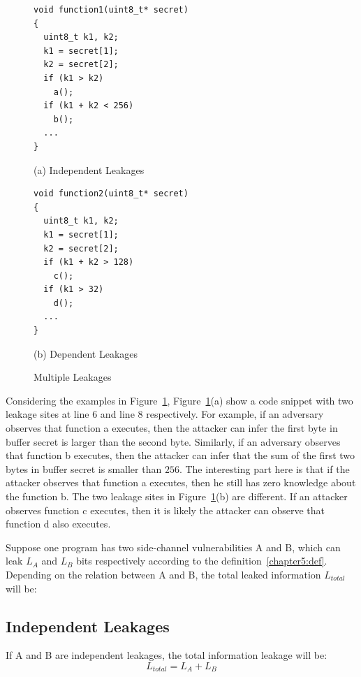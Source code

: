 \begin{figure}[h]
\begin{minipage}{0.4\linewidth}
\begin{lstlisting}
void function1(uint8_t* secret)
{
  uint8_t k1, k2;
  k1 = secret[1];
  k2 = secret[2];
  if (k1 > k2)
    a();
  if (k1 + k2 < 256)
    b();
  ...
}
\end{lstlisting}\caption*{(a) Independent Leakages}
\end{minipage}
\hfill
\begin{minipage}{0.4\linewidth}
\begin{lstlisting}
void function2(uint8_t* secret)
{
  uint8_t k1, k2;
  k1 = secret[1];
  k2 = secret[2];
  if (k1 + k2 > 128)
    c();
  if (k1 > 32)
    d();
  ...
}
\end{lstlisting} \caption*{(b) Dependent Leakages}
\end{minipage}
\caption{Multiple Leakages}\label{chapter5:fig:multiple}
\end{figure}

Considering the examples in Figure~\ref{chapter5:fig:multiple}, Figure~\ref{chapter5:fig:multiple}(a) show a code snippet with two leakage sites at line 6 and line 8 respectively. For example, if an adversary observes that function \textsf{a} executes, then the attacker can infer the first byte in buffer \textsf{secret} is larger than the second byte.  Similarly, if an adversary observes that function \textsf{b} executes, then the attacker can infer that the sum of the first two bytes in buffer \textsf{secret} is smaller than $256$. The interesting part here is that if the attacker observes that function \textsf{a} executes, then he still has zero knowledge about the function \textsf{b}. The two leakage sites in Figure~\ref{chapter5:fig:multiple}(b) are different. If an attacker observes function \textsf{c} executes, then it is likely the attacker can observe that function \textsf{d} also executes. 

Suppose one program has two side-channel vulnerabilities A and B, which can leak $L_A$ and $L_B$ bits respectively according to the definition~\ref{chapter5:def}. 
Depending on the relation between A and B, the total leaked information $L_{\mathit{total}}$ will be:

\subsection{Independent Leakages}
If A and B are independent leakages, the total information leakage will be:
$$L_{\mathit{total}} = L_A + L_B $$

